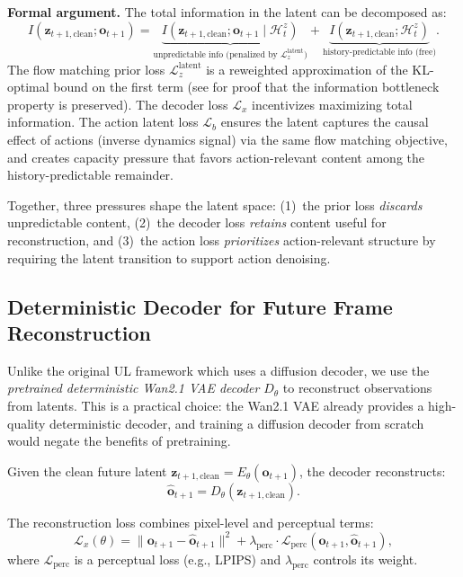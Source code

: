 \documentclass{article}
\newcommand{\vo}{\bm{o}}
\newcommand{\vz}{\bm{z}}
\newcommand{\loss}{\mathcal{L}}
\begin{document}
\textbf{Formal argument.}
The total information in the latent can be decomposed as:
\begin{equation}
  I(\vz_{t+1,\text{clean}}; \vo_{t+1}) = \underbrace{I(\vz_{t+1,\text{clean}}; \vo_{t+1} \mid \mathcal{H}_t^z)}_{\text{unpredictable info (penalized by } \loss_z^{\text{latent}}\text{)}} + \underbrace{I(\vz_{t+1,\text{clean}}; \mathcal{H}_t^z)}_{\text{history-predictable info (free)}}.
  \label{eq:info_decomp}
\end{equation}
The flow matching prior loss $\loss_z^{\text{latent}}$ is a reweighted approximation of the KL-optimal bound on the first term (see  for proof that the information bottleneck property is preserved). The decoder loss $\loss_x$ incentivizes maximizing total information. The action latent loss $\loss_b$ ensures the latent captures the causal effect of actions (inverse dynamics signal) via the same flow matching objective, and creates capacity pressure that favors action-relevant content among the history-predictable remainder.

Together, three pressures shape the latent space: (1)~the prior loss \emph{discards} unpredictable content, (2)~the decoder loss \emph{retains} content useful for reconstruction, and (3)~the action loss \emph{prioritizes} action-relevant structure by requiring the latent transition to support action denoising.

\subsection{Deterministic Decoder for Future Frame Reconstruction}
\label{sec:decoder}

Unlike the original UL framework which uses a diffusion decoder, we use the \emph{pretrained deterministic Wan2.1 VAE decoder} $D_\theta$ to reconstruct observations from latents.
This is a practical choice: the Wan2.1 VAE already provides a high-quality deterministic decoder, and training a diffusion decoder from scratch would negate the benefits of pretraining.

Given the clean future latent $\vz_{t+1,\text{clean}} = E_\theta(\vo_{t+1})$, the decoder reconstructs:
\begin{equation}
  \hat{\vo}_{t+1} = D_\theta(\vz_{t+1,\text{clean}}).
  \label{eq:deterministic_decode}
\end{equation}

The reconstruction loss combines pixel-level and perceptual terms:
\begin{equation}
  \loss_x(\theta) = \|\vo_{t+1} - \hat{\vo}_{t+1}\|^2 + \lambda_{\text{perc}} \cdot \loss_{\text{perc}}(\vo_{t+1}, \hat{\vo}_{t+1}),
  \label{eq:recon_loss}
\end{equation}
where $\loss_{\text{perc}}$ is a perceptual loss (e.g., LPIPS) and $\lambda_{\text{perc}}$ controls its weight.
\end{document}
